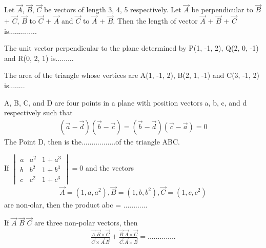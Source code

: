 \item Let $\overrightarrow{A}$, $\overrightarrow{B}$, $\overrightarrow{C}$ be vectors of length 3, 4, 5 respectively. Let $\overrightarrow{A}$ be perpendicular to $\overrightarrow{B}$ + $\overrightarrow{C}$, $\overrightarrow{B}$ to 
$\overrightarrow{C}$ + $\overrightarrow{A}$ and $\overrightarrow{C}$ to $\overrightarrow{A}$ + $\overrightarrow{B}$. Then the length of vector $\overrightarrow{A}$ + $\overrightarrow{B}$ + $\overrightarrow{C}$ is..............

\item The unit vector perpendicular to the plane determined by P(1, -1, 2), Q(2, 0, -1) and R(0, 2, 1) is.........

\item The area of the triangle whose vertices are  A(1, -1, 2), B(2, 1, -1) and C(3, -1, 2) is........

\item A, B, C, and D are four points in a plane with position vectors a, b, c, and d respectively such that
\begin{align*}
(\overrightarrow{a} - \overrightarrow{d}) (\overrightarrow{b} - \overrightarrow{c}) 
= (\overrightarrow{b} - \overrightarrow{d}) (\overrightarrow{c} - \overrightarrow{a}) = 0
\end{align*}
The Point D, then is the.................of the triangle ABC.

\item If 
$\begin{vmatrix}
a & a^{2} & 1 + a^{3} \\ b & b^{2} & 1 + b^{3} \\ c & c^{2} & 1 + c^{3} 
\end{vmatrix} = 0$ 
and the vectors 
\begin{align*}
\overrightarrow{A} = (1, a, a^{2}), \overrightarrow{B} = (1, b, b^{2}), \overrightarrow{C} = (1, c, c^{2})
\end{align*}
are non-olar, then the product abc = ............

\item If $\overrightarrow{A}$  $\overrightarrow{B}$  $\overrightarrow{C}$ are three non-polar vectors, then 
\begin{align*}
\frac{\overrightarrow{A} . \overrightarrow{B} \times \overrightarrow{C}}{\overrightarrow{C} \times \overrightarrow{A} . \overrightarrow{B}} + \frac{\overrightarrow{B} . \overrightarrow{A} \times \overrightarrow{C}}{\overrightarrow{C} . \overrightarrow{A} \times \overrightarrow{B}} = ..............
\end{align*}

